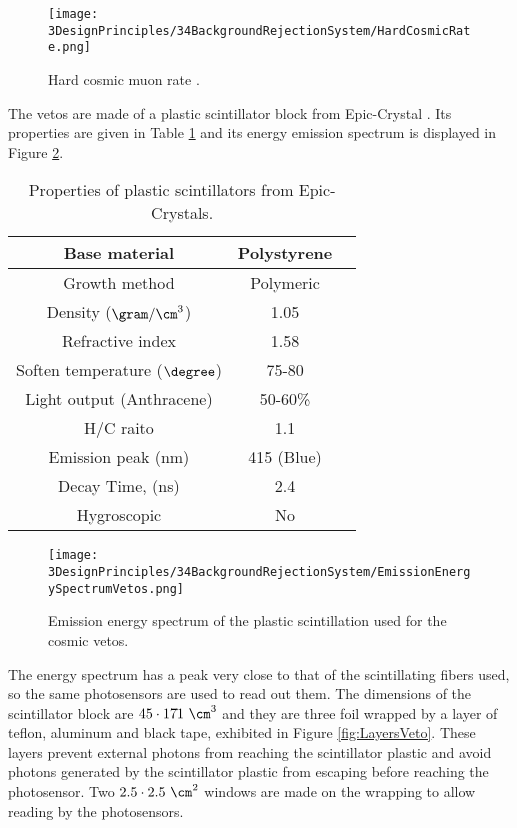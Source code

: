 \begin{figure}[h]
\centering
\texttt{[image: 3DesignPrinciples/34BackgroundRejectionSystem/HardCosmicRate.png]}
\caption{Hard cosmic muon rate \cite{HardCosmicMuonRatePlot}.\label{fig:HardCoscmicRate}}
\end{figure}

The vetos are made of a plastic scintillator block from Epic-Crystal \cite{ScintillatorVeto}. Its properties are given in Table \ref{tab:ParametersScintillatorVeto} and its energy emission spectrum is displayed in Figure \ref{fig:EmissionEnergySpectrumVeto}.

\begin{table}[]
\begin{center}
\begin{tabular}{|c|c|c|}
\hline \hline 
Base material & Polystyrene \\ \hline
Growth method & Polymeric \\ \hline
Density ($\gram/\cm^3$)& 1.05 \\ \hline
Refractive index & 1.58 \\ \hline
Soften temperature ($\degree$) & 75-80 \\ \hline
Light output (Anthracene) & 50-60\% \\ \hline
H/C raito & 1.1 \\ \hline
Emission peak (nm) & 415 (Blue) \\ \hline
Decay Time, (ns) & 2.4 \\ \hline
Hygroscopic & No \\ \hline
\end{tabular}
\caption{Properties of plastic scintillators from Epic-Crystals. \cite{ScintillatorVeto}}
\label{tab:ParametersScintillatorVeto}
\end{center}
\end{table}

\begin{figure}[]
\centering
\texttt{[image: 3DesignPrinciples/34BackgroundRejectionSystem/EmissionEnergySpectrumVetos.png]}
\caption{Emission energy spectrum of the plastic scintillation used for the cosmic vetos.\label{fig:EmissionEnergySpectrumVeto}~\cite{ScintillatorVeto}}
\end{figure}

The energy spectrum has a peak very close to that of the scintillating fibers used, so the same photosensors are used to read out them. The dimensions of the scintillator block are $45 \cdot{} 17 \dot{} 1~\cm^3$ and they are three foil wrapped by a layer of teflon, aluminum and black tape, exhibited in Figure \ref{fig:LayersVeto}. These layers prevent external photons from reaching the scintillator plastic and avoid photons generated by the scintillator plastic from escaping before reaching the photosensor. Two $2.5\cdot{} 2.5 ~\cm^2$ windows are made on the wrapping to allow reading by the photosensors.


